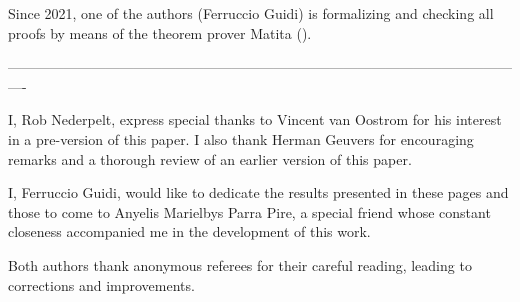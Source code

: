 \documentclass[submission,copyright,creativecommons]{eptcs}
\begin{document}
Since 2021, one of the authors (Ferruccio Guidi) is formalizing and checking all proofs by means of the theorem prover Matita (\cite{Asp}).

----------------------------------------------------------------------------------------------------------------

I, Rob Nederpelt, express special thanks to Vincent van Oostrom for his interest in a pre-version of this paper. I also thank Herman Geuvers for encouraging remarks and a thorough review of an earlier version of this paper.

I, Ferruccio Guidi, would like to dedicate the results presented in these pages and those to come to Anyelis Marielbys Parra Pire, a special friend whose constant closeness accompanied me in the development of this work.

Both authors thank anonymous referees for their careful reading, leading to corrections and improvements.



\end{document}
